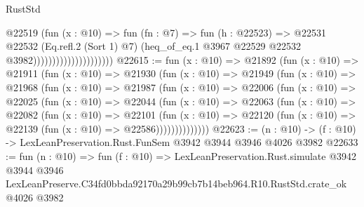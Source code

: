 \begin{lexlean}{RustStd}
\begin{coremodule}
                                        @22519
                                          (fun (x : @10) =>
                                          fun (fn : @7) =>
                                          fun (h : @22523) =>
                                          @22531
                                            @22532
                                            (Eq.refl.{2} (Sort 1) @7)
                                            (heq_of_eq.{1}
                                              @3967
                                              @22529
                                              @22532
                                              @3982)))))))))))))))))))))
@22615 := fun (x : @10) =>
  @21892
    (fun (x : @10) =>
    @21911
      (fun (x : @10) =>
      @21930
        (fun (x : @10) =>
        @21949
          (fun (x : @10) =>
          @21968
            (fun (x : @10) =>
            @21987
              (fun (x : @10) =>
              @22006
                (fun (x : @10) =>
                @22025
                  (fun (x : @10) =>
                  @22044
                    (fun (x : @10) =>
                    @22063
                      (fun (x : @10) =>
                      @22082
                        (fun (x : @10) =>
                        @22101
                          (fun (x : @10) =>
                          @22120 (fun (x : @10) => @22139 (fun (x : @10) => @22586))))))))))))))
@22623 := (n : @10) -> (f : @10) -> LexLeanPreservation.Rust.FunSem @3942 @3944 @3946 @4026 @3982
@22633 := fun (n : @10) =>
  fun (f : @10) =>
  LexLeanPreservation.Rust.simulate
    @3942
    @3944
    @3946
    LexLeanPreserve.C34fd0bbda92170a29b99cb7b14beb964.R10.RustStd.crate_ok
    @4026
    @3982
\end{coremodule}
\end{lexlean}

